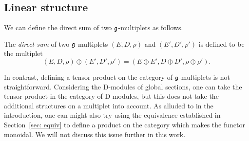 \documentclass[pdftex]{sigma}
\numberwithin{equation}{section}
\def\cE{\mathcal E}\def\cF{\mathcal F}\def\cG{\mathcal G}\def\cH{\mathcal H}
\DeclareMathOperator{\id}{id}
\begin{document}
\subsection{Linear structure}

We can define the direct sum of two $\mathfrak g$-multiplets as follows.
\begin{dfn}
	The \emph{direct sum} of two $\mathfrak g$-multiplets $(E,D,\rho)$ and $(E',D',\rho')$ is defined to be the multiplet
	\begin{equation*}
	(E,D,\rho) \oplus (E',D',\rho') = (E\oplus E', D \oplus D', \rho \oplus \rho') .
	\end{equation*}
\end{dfn}


\begin{rmk}
	In contrast, defining a tensor product on the category of $\mathfrak g$-multiplets is not straightforward. Considering the D-modules of global sections, one can take the tensor product in the category of D-modules, but this does not take the additional structures on a multiplet into account. As alluded to in the introduction, one can might also try using the equivalence established in Section~\ref{sec: equiv} to define a product on the category which makes the functor monoidal. We will not discuss this issue further in this work.
\end{rmk}


\end{document}
